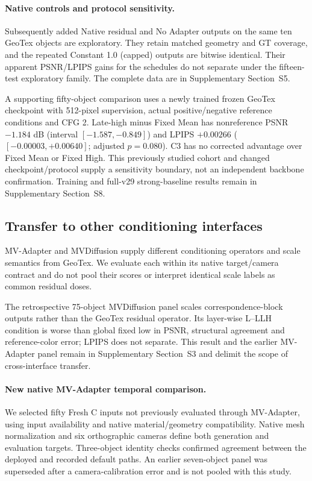 \documentclass[times,twocolumn,final]{elsarticle}
\begin{document}
\paragraph{Native controls and protocol sensitivity.}
Subsequently added Native residual and No Adapter outputs on the same ten GeoTex objects are exploratory. They retain matched geometry and GT coverage, and the repeated Constant 1.0 (capped) outputs are bitwise identical. Their apparent PSNR/LPIPS gains for the schedules do not separate under the fifteen-test exploratory family. The complete data are in Supplementary Section~S5.

A supporting fifty-object comparison uses a newly trained frozen GeoTex checkpoint with 512-pixel supervision, actual positive/negative reference conditions and CFG 2. Late-high minus Fixed Mean has nonreference PSNR $-1.184$ dB (interval $[-1.587,-0.849]$) and LPIPS $+0.00266$ ($[-0.00003,+0.00640]$; adjusted $p=0.080$). C3 has no corrected advantage over Fixed Mean or Fixed High. This previously studied cohort and changed checkpoint/protocol supply a sensitivity boundary, not an independent backbone confirmation. Training and full-v29 strong-baseline results remain in Supplementary Section~S8.

\subsection{Transfer to other conditioning interfaces}
\label{subsec:cross-interface}
MV-Adapter and MVDiffusion supply different conditioning operators and scale semantics from GeoTex. We evaluate each within its native target/camera contract and do not pool their scores or interpret identical scale labels as common residual doses.

The retrospective 75-object MVDiffusion panel scales correspondence-block outputs rather than the GeoTex residual operator. Its layer-wise L--LLH condition is worse than global fixed low in PSNR, structural agreement and reference-color error; LPIPS does not separate. This result and the earlier MV-Adapter panel remain in Supplementary Section~S3 and delimit the scope of cross-interface transfer.

\paragraph{New native MV-Adapter temporal comparison.}
\label{subsec:new-mva}
We selected fifty Fresh C inputs not previously evaluated through MV-Adapter, using input availability and native material/geometry compatibility. Native mesh normalization and six orthographic cameras define both generation and evaluation targets. Three-object identity checks confirmed agreement between the deployed and recorded default paths. An earlier seven-object panel was superseded after a camera-calibration error and is not pooled with this study.
\end{document}
